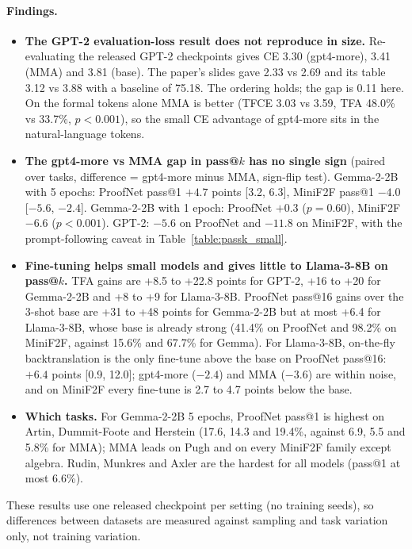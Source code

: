 \documentclass{article} %
\begin{document}
\paragraph{Findings.}
\begin{itemize}
    \item \textbf{The GPT-2 evaluation-loss result does not reproduce in size.} Re-evaluating the released GPT-2 checkpoints gives CE 3.30 (gpt4-more), 3.41 (MMA) and 3.81 (base). The paper's slides gave 2.33 vs 2.69 and its table 3.12 vs 3.88 with a baseline of 75.18. The ordering holds; the gap is 0.11 here. On the formal tokens alone MMA is better (TFCE 3.03 vs 3.59, TFA 48.0\% vs 33.7\%, $p<0.001$), so the small CE advantage of gpt4-more sits in the natural-language tokens.
    \item \textbf{The gpt4-more vs MMA gap in pass@$k$ has no single sign} (paired over tasks, difference = gpt4-more minus MMA, sign-flip test). Gemma-2-2B with 5 epochs: ProofNet pass@1 $+4.7$ points [3.2, 6.3], MiniF2F pass@1 $-4.0$ [$-5.6$, $-2.4$]. Gemma-2-2B with 1 epoch: ProofNet $+0.3$ ($p=0.60$), MiniF2F $-6.6$ ($p<0.001$). GPT-2: $-5.6$ on ProofNet and $-11.8$ on MiniF2F, with the prompt-following caveat in Table~\ref{table:passk_small}.
    \item \textbf{Fine-tuning helps small models and gives little to Llama-3-8B on pass@$k$.} TFA gains are +8.5 to +22.8 points for GPT-2, +16 to +20 for Gemma-2-2B and +8 to +9 for Llama-3-8B. ProofNet pass@16 gains over the 3-shot base are +31 to +48 points for Gemma-2-2B but at most +6.4 for Llama-3-8B, whose base is already strong (41.4\% on ProofNet and 98.2\% on MiniF2F, against 15.6\% and 67.7\% for Gemma). For Llama-3-8B, on-the-fly backtranslation is the only fine-tune above the base on ProofNet pass@16: $+6.4$ points [0.9, 12.0]; gpt4-more ($-2.4$) and MMA ($-3.6$) are within noise, and on MiniF2F every fine-tune is 2.7 to 4.7 points below the base.
    \item \textbf{Which tasks.} For Gemma-2-2B 5 epochs, ProofNet pass@1 is highest on Artin, Dummit-Foote and Herstein (17.6, 14.3 and 19.4\%, against 6.9, 5.5 and 5.8\% for MMA); MMA leads on Pugh and on every MiniF2F family except algebra. Rudin, Munkres and Axler are the hardest for all models (pass@1 at most 6.6\%).
\end{itemize}
These results use one released checkpoint per setting (no training seeds), so differences between datasets are measured against sampling and task variation only, not training variation.
\end{document}
